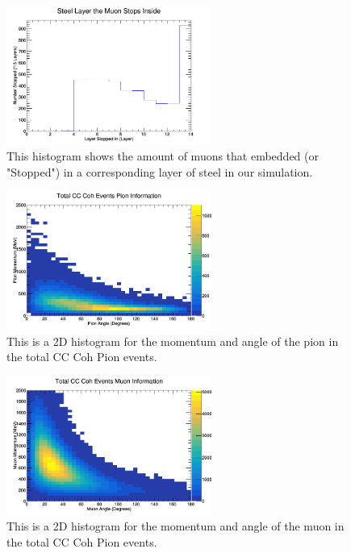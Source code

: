\documentclass[11pt]{article}
\begin{document}
\begin{figure}[H]
\centering
\includegraphics[width=0.6\textwidth]{NewANMBergerSehgalImages/7-LayerPenetrationANMBS.png}
\caption{This histogram shows the amount of muons that embedded (or "Stopped") in a corresponding layer of steel in our simulation.}
\end{figure}

\begin{figure}[H]
\centering
\includegraphics[width=0.6\textwidth]{NewANMBergerSehgalImages/8-TotalCCCohPionInfoANMBS.png}
\caption{This is a 2D histogram for the momentum and angle of the pion in the total CC Coh Pion events.}
\end{figure}

\begin{figure}[H]
\centering
\includegraphics[width=0.6\textwidth]{NewANMBergerSehgalImages/9-TotalCCCohMuonInfoANMBS.png}
\caption{This is a 2D histogram for the momentum and angle of the muon in the total CC Coh Pion events.}
\end{figure}
\end{document}
